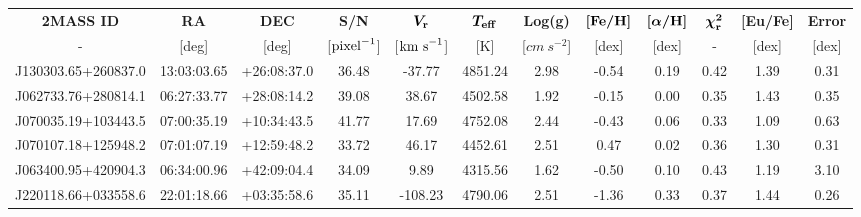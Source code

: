 \documentclass[a4paper,fleqn,usenatbib]{mnras}
\begin{document}
	\begin{table}
		\centering
		\label{Data for the 47}
		\begin{tabular}{@{}cccccccccccc@{}}
			\toprule
			\textbf{2MASS ID}   & \textbf{RA} & \textbf{DEC} & \textbf{S/N}        	& \textbf{$\boldsymbol{V_{\rm{r}}}$}   & \textbf{$\boldsymbol{T_{\rm{eff}}}$} & \textbf{Log(g)}	& \textbf{$\boldsymbol{[\rm{Fe/H}]}$} & \textbf{$\boldsymbol{[\alpha/\rm{H}]}$} & \textbf{$\boldsymbol{\chi_{\rm{r}}^{2}}$} & \textbf{{[}Eu/Fe{]}} & \textbf{Error} \\
			-               	& {[}deg{]}   & {[}deg{]}	& {[}$\rm{pixel}^{-1}${]} & {[}$\rm{km\ s}^{-1}${]} & {[}K{]}             	& {[}$cm\ s^{-2}${]} & {[}dex{]}          	& {[}dex{]}              	& -                        	& {[}dex{]}        	& {[}dex{]}  	\\ \midrule
			J130303.65+260837.0 & 13:03:03.65 & +26:08:37.0  & 36.48               	& -37.77              	& 4851.24             	& 2.98           	& -0.54              	& 0.19                   	& 0.42                     	& 1.39             	& 0.31       	\\
			J062733.76+280814.1 & 06:27:33.77 & +28:08:14.2  & 39.08               	& 38.67               	& 4502.58             	& 1.92           	& -0.15              	& 0.00                   	& 0.35                     	& 1.43             	& 0.35       	\\
			J070035.19+103443.5 & 07:00:35.19 & +10:34:43.5  & 41.77               	& 17.69               	& 4752.08             	& 2.44           	& -0.43              	& 0.06                   	& 0.33                     	& 1.09             	& 0.63       	\\
			J070107.18+125948.2 & 07:01:07.19 & +12:59:48.2  & 33.72               	& 46.17               	& 4452.61             	& 2.51           	& 0.47               	& 0.02                   	& 0.36                     	& 1.30             	& 0.31       	\\
			J063400.95+420904.3 & 06:34:00.96 & +42:09:04.4  & 34.09               	& 9.89                	& 4315.56             	& 1.62           	& -0.50              	& 0.10                   	& 0.43                     	& 1.19             	& 3.10       	\\
			J220118.66+033558.6 & 22:01:18.66 & +03:35:58.6  & 35.11               	& -108.23             	& 4790.06             	& 2.51           	& -1.36              	& 0.33                   	& 0.37                     	& 1.44             	& 0.26       	\\

\end{tabular}
\end{table}
\end{document}
